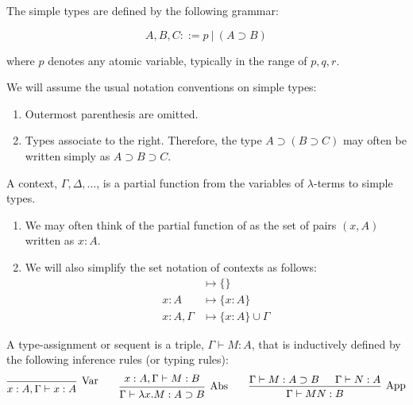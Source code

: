 \cite{Barendregt2013}

\begin{definition}
  The simple types are defined by the following grammar:
  
  \[
    A, B, C ::= p \ | \ (A \supset B)
  \]
  
  where $p$ denotes any atomic variable, typically in the range of $p, q, r$.
\end{definition}

\begin{notation}
  We will assume the usual notation conventions on simple types:  
  \begin{enumerate}
  \item Outermost parenthesis are omitted.
  \item Types associate to the right. Therefore, the type $A \supset (B \supset C)$ may often be written simply as $A \supset B \supset C$.
  \end{enumerate}
\end{notation}

\begin{definition}[Context]
  A context, $\Gamma, \Delta, \dots$, is a partial function from the variables of $\lambda$-terms to simple types.
\end{definition}

\begin{notation} \hfill
  \begin{enumerate}
  \item We may often think of the partial function of as the set of pairs $(x, A)$ written as $x:A$.
  \item We will also simplify the set notation of contexts as follows:
    \begin{align*}
      &\mapsto \{ \} \\
      x:A         &\mapsto \{ x:A \} \\
      x:A, \Gamma &\mapsto \{ x:A \} \cup \Gamma
    \end{align*}
  \end{enumerate}
\end{notation}

\begin{definition}
  A type-assignment or sequent is a triple, $\Gamma \vdash M:A$, that is inductively defined by the following inference rules (or typing rules):
  \[
    \begin{prooftree}
      \infer0[Var]{ x:A, \Gamma \vdash x:A } 
    \end{prooftree}
    \qquad
    \begin{prooftree}
      \hypo{ x:A, \Gamma \vdash M:B }
      \infer1[Abs]{ \Gamma \vdash \lambda x . M : A \supset B  } 
    \end{prooftree}
    \qquad
    \begin{prooftree}
      \hypo{ \Gamma \vdash M : A \supset B }
      \hypo{ \Gamma \vdash N : A }	
      \infer2[App]{ \Gamma \vdash M N : B } 
    \end{prooftree}
  \]
\end{definition}


